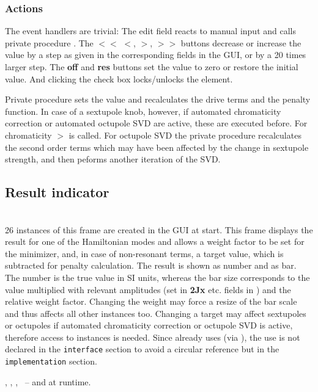 \documentclass[12pt]{article}
\newcommand\code[1]{{\tt #1}}
\newcommand{\ofld}[1]{\colorbox{black!15}{{\bf #1}}}
\newcommand\guifco[1]{{\color{violet}\code{#1}}}
\newcommand{\unico}[1]{{\color{burntorange}\code{#1}}}
\newcommand{\prcod}[2]{\opauni{#1}$>$\unico{#2}}
\newcommand{\opagui}[1]{\colorbox{blue!20}{{\color{black}\code{#1}}}}
\newcommand{\ogui}[1]{\hyperref[#1]{\opagui{#1}}}
\newcommand{\opaguif}[1]{\colorbox{violet!30}{{\color{black}\code{#1}}}}
\newcommand{\oguifh}[2]{\subsection{\label{#2}#1}{\Huge\opaguif{#2}}\\}
\newcommand{\oguif}[1]{\hyperref[#1]{\opaguif{#1}}}
\newcommand{\opauni}[1]{\colorbox{orange!30}{{\color{black}\code{#1}}}}
\newcommand{\ouni}[1]{\hyperref[#1]{\opauni{#1}}}
\newcommand{\uses}[1]{\flushleft {\bf Uses:} #1}
\newcommand{\desc}[1]{#1}
\newcommand{\act}[1]{\subsubsection*{Actions} #1}
\begin{document}
\act{
The event handlers are trivial: The edit field reacts to manual input and calls private procedure \guifco{UpdateVal}. The \ofld{$<<$} \ofld{$<$}, \ofld{$>$}, \ofld{$>>$} buttons decrease or increase the value by a step as given in the corresponding fields in the \ogui{opachroma} GUI, or by a 20 times larger step. The \ofld{off} and \ofld{res} buttons set the value to zero or restore the initial value. And clicking the check box locks/unlocks the element.

Private procedure \guifco{UpdateVal} sets the value and recalculates the drive terms and the penalty function. In case of a sextupole knob, however, if automated chromaticity correction or automated octupole SVD are active, these are executed before. For chromaticity \prcod{chromlib}{ChromCorrect} is called. For octupole SVD the private procedure \guifco{OsvdStep} recalculates the second order terms which may have been affected by the change in sextupole strength, and then peforms another iteration of the SVD. 
}


\oguifh{Result indicator}{chamframe} 

\desc{26 instances of this frame are created in the \ogui{opachroma} GUI at start. This frame displays the result for one of the Hamiltonian modes and allows a weight factor to be set for the minimizer, and, in case of non-resonant terms, a target value, which is subtracted for penalty calculation.  The result is shown as number and as bar. The number is the true value in SI units, whereas the bar size corresponds to the value multiplied with relevant amplitudes (set in \ofld{2Jx} etc. fields in \ogui{opachroma}) and the relative weight factor. Changing the weight may force a resize of the bar scale and thus affects all other \oguif{chamframe} instances too. Changing a target may affect sextupoles or octupoles if automated chromaticity correction or octupole SVD is active, therefore access to \oguif{csexframe} instances is needed. Since \oguif{csexframe} already uses \oguif{chamframe} (via \ouni{chromreslib}), the use is not declared in the \code{interface} section to avoid a circular reference but in the \code{implementation} section. 
}

\uses{
\ouni{chromelelib},  \ouni{chromlib}, \ouni{globlib}, \ouni{../com/asaux}~-- and \oguif{csexframe} at runtime.
}
\end{document}
